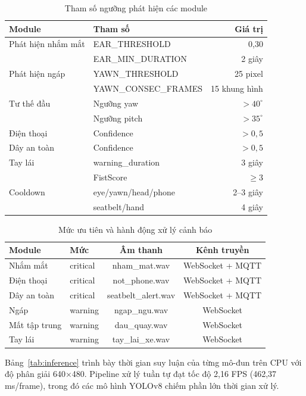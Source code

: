 \begin{table}[H]
\centering
\caption{Tham số ngưỡng phát hiện các module}
\fontsize{7}{8.5}\selectfont
\setlength{\tabcolsep}{2.5pt}
\begin{tabular}{llr}
\toprule
Module & Tham số & Giá trị \\
\midrule
Phát hiện nhắm mắt & EAR\_THRESHOLD & 0,30 \\
 & EAR\_MIN\_DURATION & 2 giây \\
Phát hiện ngáp & YAWN\_THRESHOLD & 25 pixel \\
 & YAWN\_CONSEC\_FRAMES & 15 khung hình \\
Tư thế đầu & Ngưỡng yaw & $>40^\circ$ \\
 & Ngưỡng pitch & $>35^\circ$ \\
Điện thoại & Confidence & $>0,5$ \\
Dây an toàn & Confidence & $>0,5$ \\
Tay lái & warning\_duration & 3 giây \\
 & FistScore & $\geq 3$ \\
\midrule
Cooldown & eye/yawn/head/phone & 2--3 giây \\
 & seatbelt/hand & 4 giây \\
\bottomrule
\end{tabular}
\label{tab:thresholds}
\end{table}


\begin{table}[H]
\centering
\caption{Mức ưu tiên và hành động xử lý cảnh báo}
\fontsize{7}{8.5}\selectfont
\setlength{\tabcolsep}{2.5pt}
\begin{tabular}{llcc}
\toprule
Module & Mức & Âm thanh & Kênh truyền \\
\midrule
Nhắm mắt & critical & nham\_mat.wav & WebSocket + MQTT \\
Điện thoại & critical & not\_phone.wav & WebSocket + MQTT \\
Dây an toàn & critical & seatbelt\_alert.wav & WebSocket + MQTT \\
Ngáp & warning & ngap\_ngu.wav & WebSocket \\
Mất tập trung & warning & dau\_quay.wav & WebSocket \\
Tay lái & warning & tay\_lai\_xe.wav & WebSocket \\
\bottomrule
\end{tabular}
\label{tab:priority}
\end{table}

Bảng~\ref{tab:inference} trình bày thời gian suy luận của từng mô-đun trên CPU với độ phân giải 640$\times$480. Pipeline xử lý tuần tự đạt tốc độ 2,16 FPS (462,37 ms/frame), trong đó các mô hình YOLOv8 chiếm phần lớn thời gian xử lý.

